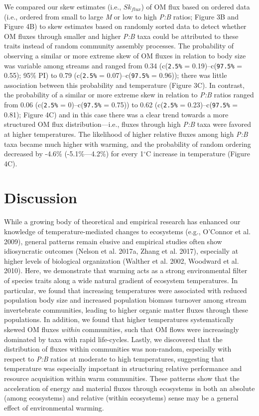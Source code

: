 \documentclass[
]{article}
\numberwithin{equation}
\begin{document}
We compared our skew estimates (i.e., \(Sk_{flux}\)) of OM flux based on
ordered data (i.e., ordered from small to large \emph{M} or low to high
\emph{P:B} ratios; Figure 3B and Figure 4B) to skew estimates based on
randomly sorted data to detect whether OM fluxes through smaller and
higher \emph{P:B} taxa could be attributed to these traits instead of
random community assembly processes. The probability of observing a
similar or more extreme skew of OM fluxes in relation to body size was
variable among streams and ranged from 0.34 (c(\texttt{2.5\%} =
0.19)--c(\texttt{97.5\%} = 0.55); 95\% PI) to 0.79 (c(\texttt{2.5\%} =
0.07)--c(\texttt{97.5\%} = 0.96)); there was little association between
this probability and temperature (Figure 3C). In contrast, the
probability of a similar or more extreme skew in relation to \emph{P:B}
ratios ranged from 0.06 (c(\texttt{2.5\%} = 0)--c(\texttt{97.5\%} =
0.75)) to 0.62 (c(\texttt{2.5\%} = 0.23)--c(\texttt{97.5\%} = 0.81);
Figure 4C) and in this case there was a clear trend towards a more
structured OM flux distribution---i.e., fluxes through high \emph{P:B}
taxa were favored at higher temperatures. The likelihood of higher
relative fluxes among high \emph{P:B} taxa became much higher with
warming, and the probability of random ordering decreased by -4.6\%
(-5.1\%---4.2\%) for every 1\(^\circ\)C increase in temperature (Figure
4C).

\hypertarget{discussion}{%
\section{Discussion}\label{discussion}}

While a growing body of theoretical and empirical research has enhanced
our knowledge of temperature-mediated changes to ecosystems (e.g.,
O'Connor et al. 2009), general patterns remain elusive and empirical
studies often show idiosyncratic outcomes (Nelson et al. 2017a, Zhang et
al. 2017), especially at higher levels of biological organization
(Walther et al. 2002, Woodward et al. 2010). Here, we demonstrate that
warming acts as a strong environmental filter of species traits along a
wide natural gradient of ecosystem temperatures. In particular, we found
that increasing temperatures were associated with reduced population
body size and increased population biomass turnover among stream
invertebrate communities, leading to higher organic matter fluxes
through these populations. In addition, we found that higher
temperatures systematically skewed OM fluxes \emph{within} communities,
such that OM flows were increasingly dominated by taxa with rapid
life-cycles. Lastly, we discovered that the distribution of fluxes
within communities was non-random, especially with respect to \emph{P:B}
ratios at moderate to high temperatures, suggesting that temperature was
especially important in structuring relative performance and resource
acquisition within warm communities. These patterns show that the
acceleration of energy and material fluxes through ecosystems in both an
absolute (among ecosystems) and relative (within ecosystems) sense may
be a general effect of environmental warming.
\end{document}
